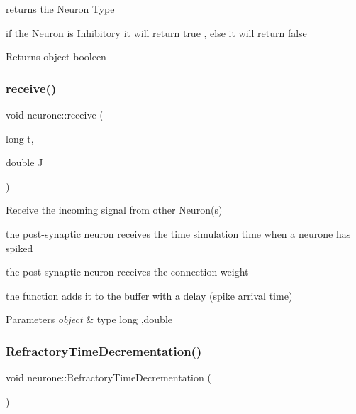 returns the Neuron Type 

if the Neuron is Inhibitory it will return true , else it will return false

\begin{DoxyReturn}{Returns}
object booleen 
\end{DoxyReturn}
\mbox{\label{classneurone_af1e157df98fa2c15cb70bc50032d39c0}} 
\subsubsection{\texorpdfstring{receive()}{receive()}}
{\footnotesize\ttfamily void neurone\+::receive (\begin{DoxyParamCaption}\item[{long}]{t,  }\item[{double}]{J }\end{DoxyParamCaption})}



Receive the incoming signal from other Neuron(s) 

the post-\/synaptic neuron receives the time simulation time when a neurone has spiked

the post-\/synaptic neuron receives the connection weight

the function add\textquotesingle{}s it to the buffer with a delay (spike arrival time)


\begin{DoxyParams}{Parameters}
{\em object} & type long ,double \\
\hline
\end{DoxyParams}
\mbox{\label{classneurone_ae24b7ac8addb3cc7b1b08042066576e6}} 
\subsubsection{\texorpdfstring{Refractory\+Time\+Decrementation()}{RefractoryTimeDecrementation()}}
{\footnotesize\ttfamily void neurone\+::\+Refractory\+Time\+Decrementation (\begin{DoxyParamCaption}{ }\end{DoxyParamCaption})}



